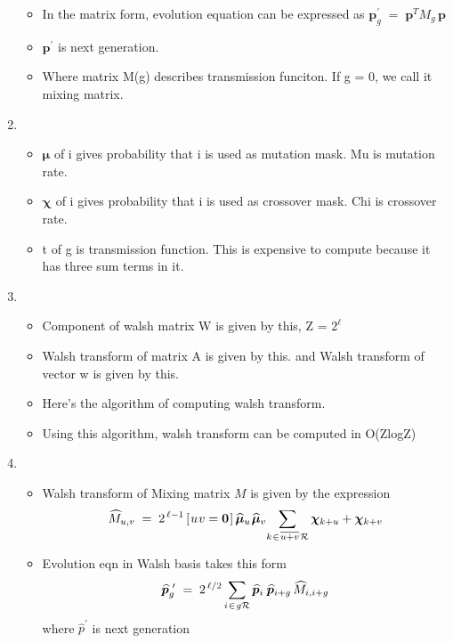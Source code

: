 \documentclass{article}
\newcommand{\nudge}{\hspace{0.01in}}
\begin{document}
\begin{enumerate}
\begin{itemize}
  \item In the matrix form, evolution equation can be expressed as $\bm{p}_g^\prime \; = \; \bm{p}^T M_g \, \bm{p}$
  \item $\bm{p}^\prime$ is next generation.
  \item Where matrix M(g) describes transmission funciton. If g = 0, we call it mixing matrix.
  \end{itemize}
    
\item
  \begin{itemize}
  \item $\bm{\mu}$ of i gives probability that i is used as mutation mask. Mu is mutation rate.
  \item $\bm{\chi}$ of i gives probability that i is used as crossover mask. Chi is crossover rate.
  \item t of g is transmission function. This is expensive to compute because it has three sum terms in it.  
  \end{itemize}
    
\item
  \begin{itemize}
  \item Component of walsh matrix W is given by this, Z = $2^\ell$
  \item Walsh transform of matrix A is given by this. 
    and Walsh transform of vector w is given by this.
  \item Here's the algorithm of computing walsh transform.
  \item Using this algorithm, walsh transform can be computed in O(ZlogZ)
  \end{itemize}
  
\item
  \begin{itemize}
  \item Walsh transform of Mixing matrix $M$ is given by the expression
    \[
      \widehat{M}_{u,v} \; = \; 2^{\,\ell-1} \,[\nudge u \nudge v = {\bf
      0}\nudge]\, \widehat{\bm{\mu}}_u \nudge \widehat{\bm{\mu}}_v \!  \sum_{k
    \nudge \in \nudge \overline{u+v} \nudge \mathcal{R}} \bm{\chi}_{k + u} +
    \bm{\chi}_{k + v}
    \]
  \item Evolution eqn in Walsh basis takes this form
  \[
    \widehat{\bm{p}}_g^{\,\,\prime} \; = \; 2^{\,\ell/2} \sum_{i \nudge \in \nudge g \mathcal{R}}
    \widehat{\bm{p}}_i \, \nudge \widehat{\bm{p}}_{i+g} \,\widehat{M}_{i,i+g}
  \]  
  where $\hat{p}^\prime$ is next generation
  \end{itemize}
    

\end{enumerate}
\end{document}
